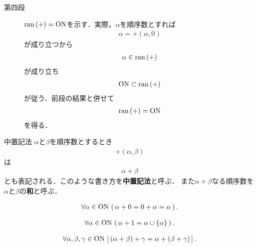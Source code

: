 \begin{sketch}
\begin{description}
			\item[第四段] $\operatorname*{ran} \left(+\right) = \mathrm{ON}$を示す．実際，$\alpha$を順序数とすれば
				\begin{align}
					\alpha = +(\alpha,0)
				\end{align}
				が成り立つから
				\begin{align}
					\alpha \in \operatorname*{ran} \left(+\right)
				\end{align}
				が成り立ち
				\begin{align}
					\mathrm{ON} \subset \operatorname*{ran} \left(+\right)
				\end{align}
				が従う．前段の結果と併せて
				\begin{align}
					\operatorname*{ran} \left(+\right) = \mathrm{ON}
				\end{align}
				を得る．
				\QED
		\end{description}
	\end{sketch}
	
	\begin{itembox}[l]{中置記法}
		$\alpha$と$\beta$を順序数とするとき
		\begin{align}
			+(\alpha,\beta)
		\end{align}
		は
		\begin{align}
			\alpha + \beta
		\end{align}
		とも表記される．このような書き方を{\bf 中置記法}と呼ぶ．
		また$\alpha + \beta$なる順序数を$\alpha$と$\beta$の{\bf 和}と呼ぶ．
	\end{itembox}
	
	\begin{screen}
		\begin{thm}[$0$を左から足しても変わらない]
			\begin{align}
				\forall \alpha \in \mathrm{ON}\, \left(\, \alpha + 0 = 0 + \alpha = \alpha\, \right).
			\end{align}
		\end{thm}
	\end{screen}
	
	\begin{screen}
		\begin{thm}
			\begin{align}
				\forall \alpha \in \mathrm{ON}\, \left(\, \alpha + 1 = \alpha \cup \{\alpha\}\, \right).
			\end{align}
		\end{thm}
	\end{screen}
	
	\begin{screen}
		\begin{thm}[加法は結合的]
			\begin{align}
				\forall \alpha,\beta,\gamma \in \mathrm{ON}\, \left[\, (\alpha + \beta) + \gamma = \alpha + (\beta + \gamma)\, \right].
			\end{align}
		\end{thm}
	\end{screen}
	
